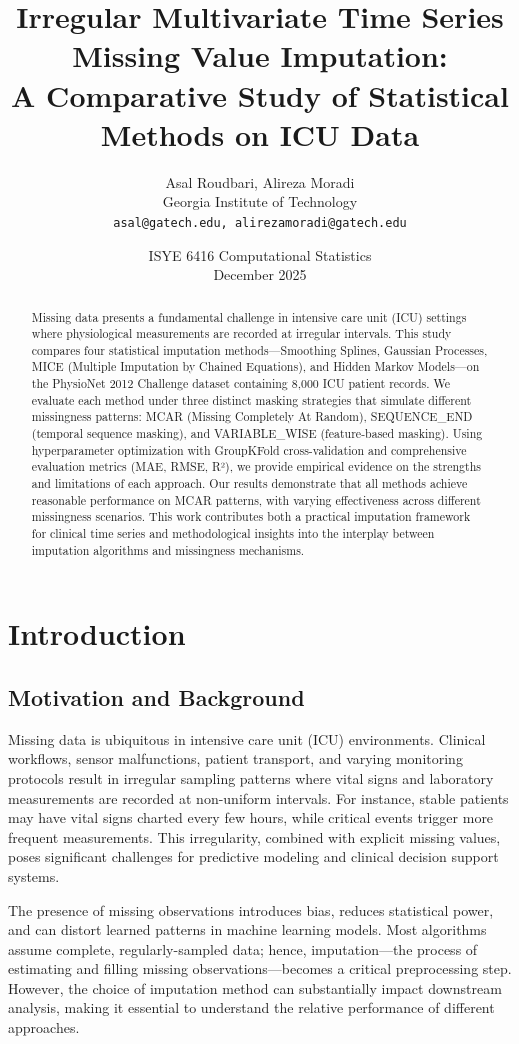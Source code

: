 \documentclass[11pt]{article}
\title{\textbf{Irregular Multivariate Time Series Missing Value Imputation:\\A Comparative Study of Statistical Methods on ICU Data}}
\author{Asal Roudbari, Alireza Moradi\\
Georgia Institute of Technology\\
\texttt{asal@gatech.edu, alirezamoradi@gatech.edu}}
\date{ISYE 6416 Computational Statistics\\December 2025}
\begin{document}
\maketitle

\begin{abstract}
Missing data presents a fundamental challenge in intensive care unit (ICU) settings where physiological measurements are recorded at irregular intervals. This study compares four statistical imputation methods—Smoothing Splines, Gaussian Processes, MICE (Multiple Imputation by Chained Equations), and Hidden Markov Models—on the PhysioNet 2012 Challenge dataset containing 8,000 ICU patient records. We evaluate each method under three distinct masking strategies that simulate different missingness patterns: MCAR (Missing Completely At Random), SEQUENCE\_END (temporal sequence masking), and VARIABLE\_WISE (feature-based masking). Using hyperparameter optimization with GroupKFold cross-validation and comprehensive evaluation metrics (MAE, RMSE, R²), we provide empirical evidence on the strengths and limitations of each approach. Our results demonstrate that all methods achieve reasonable performance on MCAR patterns, with varying effectiveness across different missingness scenarios. This work contributes both a practical imputation framework for clinical time series and methodological insights into the interplay between imputation algorithms and missingness mechanisms.
\end{abstract}

\section{Introduction}

\subsection{Motivation and Background}
Missing data is ubiquitous in intensive care unit (ICU) environments. Clinical workflows, sensor malfunctions, patient transport, and varying monitoring protocols result in irregular sampling patterns where vital signs and laboratory measurements are recorded at non-uniform intervals. For instance, stable patients may have vital signs charted every few hours, while critical events trigger more frequent measurements. This irregularity, combined with explicit missing values, poses significant challenges for predictive modeling and clinical decision support systems.

The presence of missing observations introduces bias, reduces statistical power, and can distort learned patterns in machine learning models. Most algorithms assume complete, regularly-sampled data; hence, imputation—the process of estimating and filling missing observations—becomes a critical preprocessing step. However, the choice of imputation method can substantially impact downstream analysis, making it essential to understand the relative performance of different approaches.
\end{document}
